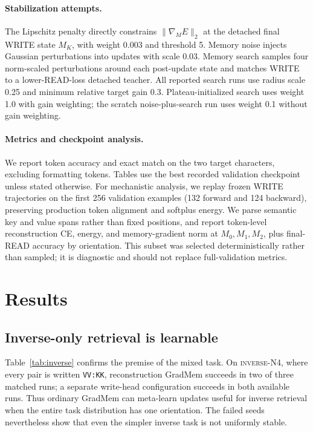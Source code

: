 \documentclass{article}
\newcommand{\inverse}{\textsc{inverse-N4}}
\newcommand{\gm}{GradMem}
\begin{document}
\paragraph{Stabilization attempts.}
The Lipschitz penalty directly constrains $\lVert\nabla_M E\rVert_2$ at the detached final WRITE state $M_K$, with weight 0.003 and threshold 5.  Memory noise injects Gaussian perturbations into updates with scale 0.03.  Memory search samples four norm-scaled perturbations around each post-update state and matches WRITE to a lower-READ-loss detached teacher.  All reported search runs use radius scale 0.25 and minimum relative target gain 0.3.  Plateau-initialized search uses weight 1.0 with gain weighting; the scratch noise-plus-search run uses weight 0.1 without gain weighting.

\paragraph{Metrics and checkpoint analysis.}
We report token accuracy and exact match on the two target characters, excluding formatting tokens.  Tables use the best recorded validation checkpoint unless stated otherwise.  For mechanistic analysis, we replay frozen WRITE trajectories on the first 256 validation examples (132 forward and 124 backward), preserving production token alignment and softplus energy.  We parse semantic key and value spans rather than fixed positions, and report token-level reconstruction CE, energy, and memory-gradient norm at $M_0,M_1,M_2$, plus final-READ accuracy by orientation.  This subset was selected deterministically rather than sampled; it is diagnostic and should not replace full-validation metrics.

\section{Results}
\label{sec:results}

\subsection{Inverse-only retrieval is learnable}

Table~\ref{tab:inverse} confirms the premise of the mixed task.  On \inverse{}, where every pair is written \texttt{VV:KK}, reconstruction \gm{} succeeds in two of three matched runs; a separate write-head configuration succeeds in both available runs.  Thus ordinary \gm{} can meta-learn updates useful for inverse retrieval when the entire task distribution has one orientation.  The failed seeds nevertheless show that even the simpler inverse task is not uniformly stable.
\end{document}
